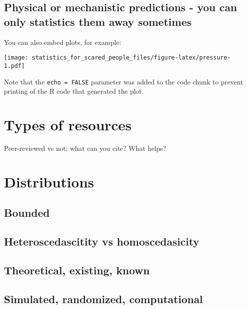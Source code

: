 \documentclass[
]{book}
\begin{document}
\hypertarget{physical-or-mechanistic-predictions---you-can-only-statistics-them-away-sometimes}{%
\section{Physical or mechanistic predictions - you can only statistics them away sometimes}\label{physical-or-mechanistic-predictions---you-can-only-statistics-them-away-sometimes}}

You can also embed plots, for example:

\texttt{[image: statistics\_for\_scared\_people\_files/figure-latex/pressure-1.pdf]}

Note that the \texttt{echo\ =\ FALSE} parameter was added to the code chunk to prevent printing of the R code that generated the plot.

\hypertarget{types-of-resources}{%
\chapter{Types of resources}\label{types-of-resources}}

Peer-reviewed vs not: what can you cite?
What helps?

\hypertarget{distributions}{%
\chapter{Distributions}\label{distributions}}

\hypertarget{bounded}{%
\section{Bounded}\label{bounded}}

\hypertarget{heteroscedascitity-vs-homoscedasicity}{%
\section{Heteroscedascitity vs homoscedasicity}\label{heteroscedascitity-vs-homoscedasicity}}

\hypertarget{theoretical-existing-known}{%
\section{Theoretical, existing, known}\label{theoretical-existing-known}}

\hypertarget{simulated-randomized-computational}{%
\section{Simulated, randomized, computational}\label{simulated-randomized-computational}}
\end{document}
